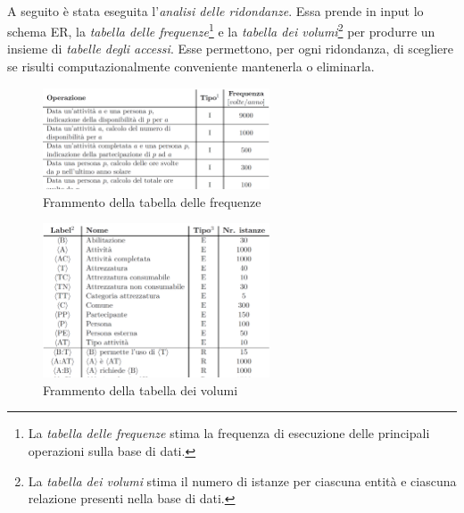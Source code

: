 \documentclass[11pt,a4paper,english]{article}
\begin{document}
\paragraph{} A seguito è stata eseguita l'\emph{analisi delle ridondanze}. Essa prende in input lo schema ER, la \emph{tabella delle frequenze}\footnote{La \emph{tabella delle frequenze} stima la frequenza di esecuzione delle principali operazioni sulla base di dati.} e la \emph{tabella dei volumi}\footnote{La \emph{tabella dei volumi} stima il numero di istanze per ciascuna entità e ciascuna relazione presenti nella base di dati.} per produrre un insieme di \emph{tabelle degli accessi}. Esse permettono, per ogni ridondanza, di scegliere se risulti computazionalmente conveniente mantenerla o eliminarla. 

\begin{figure}[H]
    \centering
    \includegraphics[width=0.6\textwidth]{img/tab_frequenze.png}
    \caption{Frammento della tabella delle frequenze}
\end{figure}

\begin{figure}[H]
    \centering
    \includegraphics[width=0.6\textwidth]{img/tab_volumi.png}
    \caption{Frammento della tabella dei volumi}
\end{figure}
\end{document}
